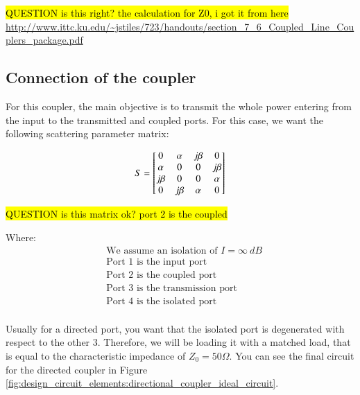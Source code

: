 \documentclass[12pt]{report} %
\newcommand{\question}[1]{\sethlcolor{red}\hl{QUESTION #1}}
\begin{document}
\question{is this right? the calculation for Z0, i got it from here}
\url{http://www.ittc.ku.edu/~jstiles/723/handouts/section_7_6_Coupled_Line_Couplers_package.pdf}

\subsection{Connection of the coupler}

For this coupler, the main objective is to transmit the whole power entering from the input to the transmitted and coupled ports. For this case, we want the following scattering parameter matrix:

\[
S = \begin{bmatrix}
0 & \alpha & j \* \beta & 0 \\
\alpha & 0 & 0 & j \* \beta \\
j \* \beta & 0 & 0 & \alpha \\
0 & j \* \beta & \alpha & 0 \\
\end{bmatrix}
\]

\question{is this matrix ok? port 2 is the coupled}

Where:
\begin{align*}
& \text{We assume an isolation of $I = \infty \ dB$}  \\
& \text{Port 1 is the input port} \\
& \text{Port 2 is the coupled port} \\
& \text{Port 3 is the transmission port} \\
& \text{Port 4 is the isolated port} \\
\end{align*}

Usually for a directed port, you want that the isolated port is degenerated with respect to the other 3. Therefore, we will be loading it with a matched load, that is equal to the characteristic impedance of $Z_0 = 50 \Omega$. You can see the final circuit for the directed coupler in Figure \ref{fig:design_circuit_elements:directional_coupler_ideal_circuit}.
\end{document}
